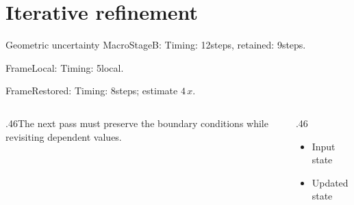 \documentclass[10pt,aspectratio=169]{beamer}
\newcommand{\fuzzlayerA}[1]{\textrm{#1}}
\newcommand{\fuzzlayerB}[1]{\fuzzlayerA{#1}}
\newcommand{\fuzzterm}[1]{\fuzzlayerB{#1}}
\newcommand{\fuzzpair}[2]{\fuzzterm{#1}: #2}
\newcommand{\fuzzunit}{steps}
\let\fuzzoriginalunit\fuzzunit
\newcommand{\fuzzcoefficient}{4}
\newcommand{\fuzzscale}[2][\fuzzcoefficient]{#1\,#2}
\begin{document}
\section{Iterative refinement}
\begin{frame}[t]{Geometric uncertainty}
\fuzzpair{MacroStageB}{Timing: 12\fuzzunit, retained: 9\fuzzoriginalunit.}\par
{\renewcommand{\fuzzunit}{local}\fuzzpair{FrameLocal}{Timing: 5\fuzzunit.}\par}
\fuzzpair{FrameRestored}{Timing: 8\fuzzunit; estimate $\fuzzscale{x}$.}\par
\begin{columns}[T]\begin{column}{.46\textwidth}The next pass must preserve the boundary conditions while revisiting dependent values.\end{column}\begin{column}{.46\textwidth}\begin{itemize}\item Input state\item Updated state\end{itemize}\end{column}\end{columns}
\end{frame}
\end{document}
